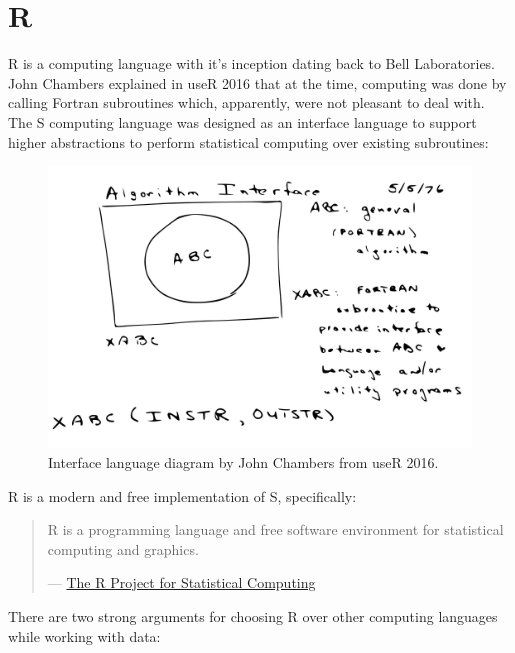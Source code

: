 \documentclass[]{book}
\theoremstyle{definition}
\theoremstyle{definition}
\theoremstyle{definition}
\theoremstyle{remark}
\begin{document}
\hypertarget{r}{%
\section{R}\label{r}}

R is a computing language with it's inception dating back to Bell
Laboratories. John Chambers explained in useR 2016 that at the time,
computing was done by calling Fortran subroutines which, apparently,
were not pleasant to deal with. The S computing language was designed as
an interface language to support higher abstractions to perform
statistical computing over existing subroutines:

\begin{figure}

{\centering \includegraphics[width=22.22in]{images/01-intro-s-algorithm-interface} 

}

\caption{Interface language diagram by John Chambers from useR 2016.}\label{fig:s-diagram}
\end{figure}

R is a modern and free implementation of S, specifically:

\begin{quote}
R is a programming language and free software environment for
statistical computing and graphics.

--- \href{https://www.r-project.org/}{The R Project for Statistical
Computing}
\end{quote}

There are two strong arguments for choosing R over other computing
languages while working with data:
\end{document}
